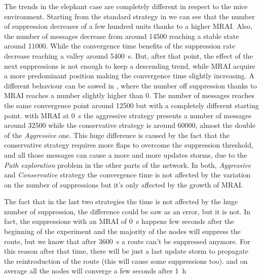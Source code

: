The trends in the elephant case are completely different in respect to the
mice environment.
Starting from the standard strategy in 
we can see that the number of suppression decreases of a few hundred units
thanks to a higher \ac{MRAI}.
Also, the number of messages decrease from around \num{14500} reaching a stable
state around \num{11000}.
While the convergence time benefits of the suppression rate decrease reaching 
a valley around \SI{5400}{\second}. 
But, after that point, the effect of the next suppressions is not enough to keep
a descending trend, while \ac{MRAI} acquire a more predominant position making
the convergence time slightly increasing.
A different behaviour can be sawed in 
,
where the number off suppression thanks to \ac{MRAI} reaches a number slightly
higher than \num{0}.
The number of messages reaches the same convergence point around \num{12500} but
with a completely different starting point.
with \ac{MRAI} at \SI{0}{\second} the aggressive strategy presents a number of 
messages around \num{32500} while the conservative strategy is around \num{60000},
almost the double of the \textit{Aggressive} one.
This huge difference is caused by the fact that the conservative strategy requires
more flaps to overcome the suppression threshold, and all those messages can 
cause a more and more updates storms, due to the \textit{Path exploration} problem
in the other parts of the network.
In both, \textit{Aggressive} and \textit{Conservative} strategy the convergence
time is not affected by the variation on the number of suppressions but it's only
affected by the growth of \ac{MRAI}.

The fact that in the last two strategies the time is not affected by the huge number
of suppression, the difference could be saw as an error, but it is not.
In fact, the suppressions with an \ac{MRAI} of \SI{0}{\second} happens
few seconds after the beginning of the experiment and the majority of the nodes
will suppress the route, but we know that after \SI{3600}{\second} a route 
can't be suppressed anymore.
For this reason after that time, there will be just a last update storm to propagate
the reintroduction of the route (this will cause some suppressions too).
and on average all the nodes will converge a few seconds after \SI{1}{\hour}

